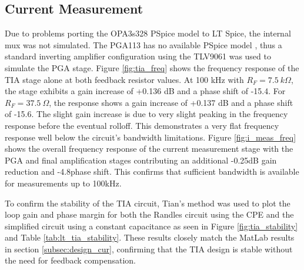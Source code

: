 \subsection{Current Measurement}
Due to problems porting the OPA3s328 PSpice model to LT Spice, the internal mux was not simulated. The PGA113 has no available PSpice model \cite{PGA113PspiceModel2022}, thus a standard inverting amplifier configuration using the TLV9061 was used to simulate the PGA stage. Figure \ref{fig:tia_freq} shows the frequency response of the TIA stage alone at both feedback resistor values. At 100 kHz with $R_F = 7.5~k\Omega$, the stage exhibits a gain increase of +0.136 dB and a phase shift of -15.4\textdegree. For $R_F = 37.5~\Omega$, the response shows a gain increase of +0.137 dB and a phase shift of -15.6\textdegree. The slight gain increase is due to very slight peaking in the frequency response before the eventual rolloff. This demonstrates a very flat frequency response well below the circuit's bandwidth limitations. Figure \ref{fig:i_meas_freq} shows the overall frequency response of the current measurement stage with the PGA and final amplification stages contributing an additional -0.25dB gain reduction and -4.8\textdegree phase shift. This confirms that sufficient bandwidth is available for measurements up to 100kHz.

To confirm the stability of the TIA circuit, Tian's method was used to plot the loop gain and phase margin for both the Randles circuit using the \ac{CPE} and the simplified circuit using a constant capacitance as seen in Figure \ref{fig:tia_stability} and Table \ref{tab:lt_tia_stability}. These results closely match the MatLab results in section \ref{subsec:design_cur}, confirming that the TIA design is stable without the need for feedback compensation.


